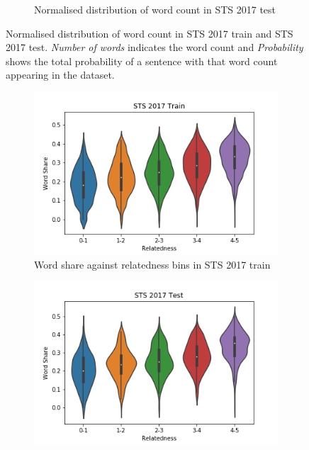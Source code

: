 \begin{enumerate}
\begin{figure}
\begin{subfigure}[b]{.5\textwidth}
		\caption{Normalised distribution of word count in STS 2017 test}
		\label{fig:sts_test_words}
	\end{subfigure}
	\caption[Normalised distribution of word count in STS 2017 train and STS 2017 test.]{Normalised distribution of word count in STS 2017 train and STS 2017 test. \textit{Number of words} indicates the word count and \textit{Probability} shows the total probability of a sentence with that word count appearing in the dataset.}
	\label{fig:sts_words}
\end{figure}

\begin{figure}
	\captionsetup[subfigure]{justification=centering}
	\centering
	\begin{subfigure}[b]{.5\textwidth}
		\centering
		\includegraphics[width=\textwidth]{figures/semantic_textual_similarity/introduction/sts_2017_train_word_share.png}
		\caption{Word share against relatedness bins in STS 2017 train}
		\label{fig:sts_train_word_share}
	\end{subfigure}%
	\begin{subfigure}[b]{.5\textwidth}
		\centering
		\includegraphics[width=\textwidth]{figures/semantic_textual_similarity/introduction/sts_2017_test_word_share.png}

\end{subfigure}
\end{figure}
\end{enumerate}
